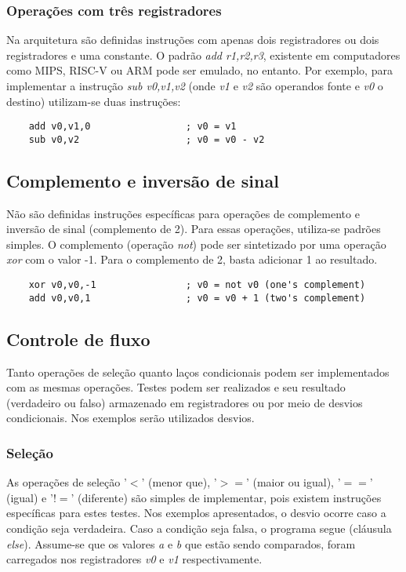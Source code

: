 \documentclass[11pt,a4paper]{report}
\begin{document}
\subsubsection{Operações com três registradores}

Na arquitetura são definidas instruções com apenas dois registradores
ou dois registradores e uma constante. O padrão \textit{add r1,r2,r3},
existente em computadores como MIPS, RISC-V ou ARM pode ser emulado,
no entanto. Por exemplo, para implementar a instrução
\textit{sub v0,v1,v2} (onde \textit{v1} e \textit{v2} são operandos
fonte e \textit{v0} o destino) utilizam-se duas instruções:

\begin{verbatim}
    add v0,v1,0                 ; v0 = v1
    sub v0,v2                   ; v0 = v0 - v2
\end{verbatim}

\subsection{Complemento e inversão de sinal}

Não são definidas instruções específicas para operações de complemento
e inversão de sinal (complemento de 2). Para essas operações, utiliza-se
padrões simples. O complemento (operação \textit{not}) pode ser
sintetizado por uma operação \textit{xor} com o valor -1. Para o
complemento de 2, basta adicionar 1 ao resultado.

\begin{verbatim}
    xor v0,v0,-1                ; v0 = not v0 (one's complement)
    add v0,v0,1                 ; v0 = v0 + 1 (two's complement)
\end{verbatim}

\subsection{Controle de fluxo}

Tanto operações de seleção quanto laços condicionais podem ser implementados
com as mesmas operações. Testes podem ser realizados e seu resultado
(verdadeiro ou falso) armazenado em registradores ou por meio de desvios
condicionais. Nos exemplos serão utilizados desvios.

\subsubsection{Seleção}

As operações de seleção '$<$' (menor que), '$>=$' (maior ou igual),
'$==$' (igual) e '$!=$' (diferente) são simples de implementar, pois existem
instruções específicas para estes testes. Nos exemplos apresentados, o
desvio ocorre caso a condição seja verdadeira. Caso a condição seja
falsa, o programa segue (cláusula \textit{else}). Assume-se que os
valores \textit{a} e \textit{b} que estão sendo comparados, foram
carregados nos registradores \textit{v0} e \textit{v1} respectivamente.
\end{document}

